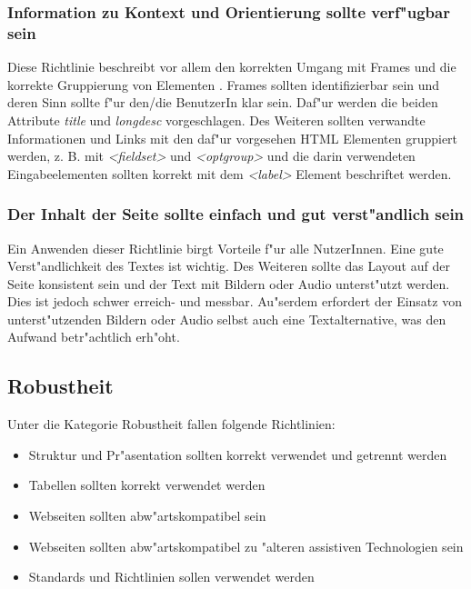 \documentclass[a4paper,bibtotoc,oneside]{scrbook}
\begin{document}
\subsubsection{Information zu Kontext und Orientierung sollte verf"ugbar sein}
Diese Richtlinie beschreibt vor allem den korrekten Umgang mit Frames und die korrekte Gruppierung von Elementen \cite[S. 50]{barr_webd}. Frames sollten identifizierbar sein und deren Sinn sollte f"ur den/die BenutzerIn klar sein. Daf"ur werden die beiden Attribute \emph{title} und \emph{longdesc} vorgeschlagen. Des Weiteren sollten verwandte Informationen und Links mit den daf"ur vorgesehen HTML Elementen gruppiert werden, z. B. mit \emph{<fieldset>} und \emph{<optgroup>} und die darin verwendeten Eingabeelementen sollten korrekt mit dem \emph{<label>} Element beschriftet werden. 
\cite[Abschnitt 6.12]{wcag1}

\subsubsection{Der Inhalt der Seite sollte einfach und gut verst"andlich sein}
Ein Anwenden dieser Richtlinie birgt Vorteile f"ur alle NutzerInnen. Eine gute Verst"andlichkeit des Textes ist wichtig. Des Weiteren sollte das Layout auf der Seite konsistent sein und der Text mit Bildern oder Audio unterst"utzt werden. \cite[Abschnitt 6.14]{wcag1}
Dies ist jedoch schwer erreich- und messbar. Au"serdem erfordert der Einsatz von unterst"utzenden Bildern oder Audio selbst auch eine Textalternative, was den Aufwand betr"achtlich erh"oht. \cite[S. 52]{barr_webd}

\subsection{Robustheit}
Unter die Kategorie Robustheit fallen folgende Richtlinien: 


\begin{itemize}
\item Struktur und Pr"asentation sollten korrekt verwendet und getrennt werden\cite[Abschnitt 6.3]{wcag1}
\item Tabellen sollten korrekt verwendet werden\cite[Abschnitt 6.5]{wcag1}
\item Webseiten sollten abw"artskompatibel sein\cite[Abschnitt 6.6]{wcag1}
\item Webseiten sollten abw"artskompatibel zu "alteren assistiven Technologien sein\cite[Abschnitt 6.10]{wcag1}
\item Standards und Richtlinien sollen verwendet werden\cite[Abschnitt 6.11]{wcag1}
\end{itemize}
\end{document}
